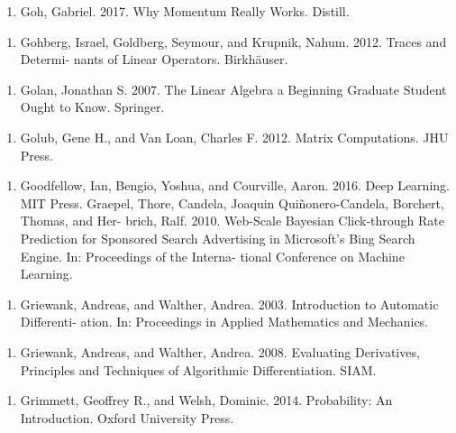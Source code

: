 \begin{enumerate}
\item Goh, Gabriel. 2017. Why Momentum Really Works. Distill.
\end{enumerate}

\begin{enumerate}
\item Gohberg, Israel, Goldberg, Seymour, and Krupnik, Nahum. 2012. Traces and Determi- nants of Linear Operators. Birkhäuser.
\end{enumerate}

\begin{enumerate}
\item Golan, Jonathan S. 2007. The Linear Algebra a Beginning Graduate Student Ought to Know. Springer.
\end{enumerate}

\begin{enumerate}
\item Golub, Gene H., and Van Loan, Charles F. 2012. Matrix Computations. JHU Press.
\end{enumerate}

\begin{enumerate}
\item Goodfellow, Ian, Bengio, Yoshua, and Courville, Aaron. 2016. Deep Learning. MIT Press. Graepel, Thore, Candela, Joaquin Quiñonero-Candela, Borchert, Thomas, and Her- brich, Ralf. 2010. Web-Scale Bayesian Click-through Rate Prediction for Sponsored Search Advertising in Microsoft’s Bing Search Engine. In: Proceedings of the Interna- tional Conference on Machine Learning.
\end{enumerate}

\begin{enumerate}
\item Griewank, Andreas, and Walther, Andrea. 2003. Introduction to Automatic Differenti- ation. In: Proceedings in Applied Mathematics and Mechanics.
\end{enumerate}

\begin{enumerate}
\item Griewank, Andreas, and Walther, Andrea. 2008. Evaluating Derivatives, Principles and Techniques of Algorithmic Differentiation. SIAM.
\end{enumerate}

\begin{enumerate}
\item Grimmett, Geoffrey R., and Welsh, Dominic. 2014. Probability: An Introduction. Oxford University Press.
\end{enumerate}

